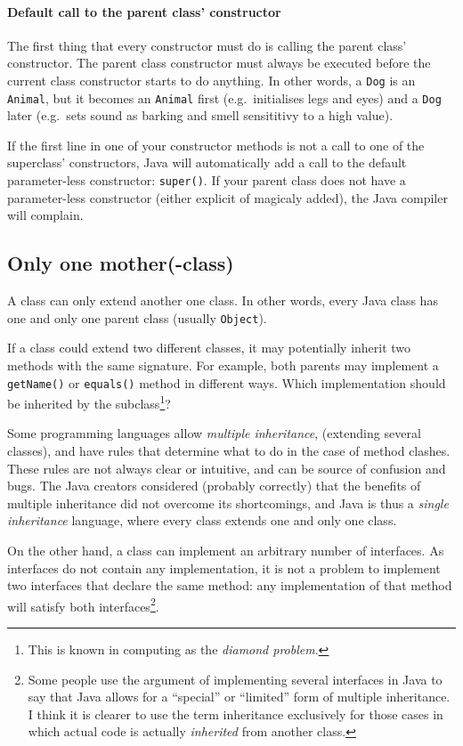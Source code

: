 \paragraph{Default call to the parent class' constructor}
\label{sec:default-call-parent}

The first thing that every constructor must do is calling the parent
class' constructor. The parent class constructor must always be
executed before the current class constructor starts to do
anything. In other words, a \verb+Dog+ is an \verb+Animal+, but it
becomes an \verb+Animal+ first (e.g.~initialises legs and eyes) and a
\verb+Dog+ later (e.g.~sets sound as barking and smell sensititivy to
a high value).

If the first line in one of your constructor methods is not a call to
one of the superclass' constructors, Java will automatically add a
call to the default parameter-less constructor: \verb+super()+. If
your parent class does not have a parameter-less constructor (either
explicit of magicaly added), the Java compiler will complain. 

\subsection{Only one mother(-class)}
\label{sec:limits-inheritance}

A class can only extend another one class. In other words, every Java
class has one and only one parent class (usually \verb+Object+). 

If a class could extend two different classes, it may potentially
inherit two methods with the same signature. For example, both parents
may implement a \verb+getName()+ or \verb+equals()+ method in
different ways. Which implementation should be inherited by the
subclass\footnote{This is known in computing as the \emph{diamond
    problem}.}?

Some programming languages allow \emph{multiple inheritance},
(extending several classes), and have rules that determine what to do
in the case of method clashes. These rules are not always clear or
intuitive, and can be source of confusion and bugs. The Java creators
considered (probably correctly) that the benefits of multiple
inheritance did not overcome its shortcomings, and Java is thus a
\emph{single inheritance} language, where every class extends one and
only one class. 

On the other hand, a class can implement an arbitrary number of
interfaces. As interfaces do not contain any implementation, it is not
a problem to implement two interfaces that declare the same method: any
implementation of that method will satisfy both
interfaces\footnote{Some people use the argument of implementing
  several interfaces in Java to say that Java allows for a ``special''
  or ``limited'' form of multiple inheritance. I think it is clearer
  to use the term inheritance exclusively for those cases 
  in which actual code is
  actually \emph{inherited} from another class. }. 

